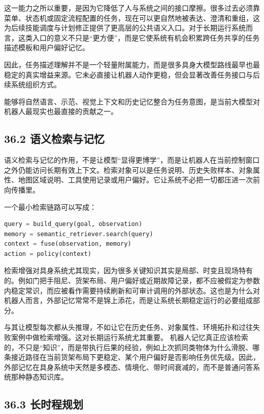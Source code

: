 这一能力之所以重要，是因为它降低了人与系统之间的接口摩擦。很多过去必须靠菜单、状态机或固定流程配置的任务，现在可以更自然地被表达、澄清和重组，这为后续技能调度与计划修正提供了更高层的公共语义入口。对于长期运行系统而言，这类入口的意义不只是“更方便”，而是它使系统有机会积累跨任务共享的任务描述模板和用户偏好记忆。

因此，任务描述理解并不是一个轻量附属能力，而是很多具身大模型路线最早也最稳定的真实增益来源。它未必直接让机器人动作更稳，但会显著改善任务接口与后续系统组织方式。

能够将自然语言、示范、视觉上下文和历史记忆整合为任务意图，是当前大模型对机器人最现实也最直接的贡献之一。

\subsection*{36.2 语义检索与记忆}


语义检索与记忆的作用，不是让模型“显得更博学”，而是让机器人在当前控制窗口之外仍能访问长期有效上下文。检索对象可以是任务说明、历史失败样本、对象属性、地图区域说明、工具使用记录或用户偏好。它让系统不必把一切都压进一次前向传播里。

一个最小检索链路可以写成：

\begin{lstlisting}[language=python]
query = build_query(goal, observation)
memory = semantic_retriever.search(query)
context = fuse(observation, memory)
action = policy(context)
\end{lstlisting}

检索增强对具身系统尤其现实，因为很多关键知识其实是局部、时变且现场特有的。例如门把手阻尼、货架布局、用户偏好或近期故障记录，都不应被假定为参数内稳定常识，而应被看作需要持续刷新和可审计调用的外部状态。这也是为什么对机器人而言，外部记忆常常不是锦上添花，而是让系统长期稳定运行的必要组成部分。

与其让模型每次都从头推理，不如让它在历史任务、对象属性、环境拓扑和过往失败案例中做检索增强。这对长期运行系统尤其重要。 机器人记忆真正应该检索的，不只是“知识”，而是带执行后果的经验，例如上次抓同类物体为什么滑脱、哪条接近路径在当前货架布局下更稳定、某个用户偏好是否影响任务优先级。因此，外部记忆在具身系统中天然是多模态、情境化、带时间衰减的，而不是普通问答系统那种静态知识库。

\subsection*{36.3 长时程规划}


